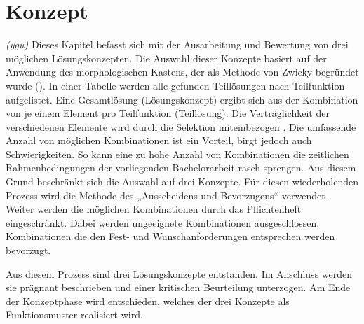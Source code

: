 \newpage
\section{Konzept}
\label{konzept}
\textit{(ygu)} Dieses Kapitel befasst sich mit der Ausarbeitung und Bewertung von drei möglichen Lösungskonzepten. Die Auswahl dieser Konzepte basiert auf der Anwendung des morphologischen Kastens, der als Methode von Zwicky begründet wurde ().   In einer Tabelle werden alle gefunden Teillösungen nach Teilfunktion aufgelistet. Eine Gesamtlösung (Lösungskonzept) ergibt sich aus der Kombination von je einem Element pro Teilfunktion (Teillösung). Die Verträglichkeit der verschiedenen Elemente wird durch die Selektion miteinbezogen \cite{naefe}.
\newline
Die umfassende Anzahl von möglichen Kombinationen ist ein Vorteil, birgt jedoch auch Schwierigkeiten. So kann eine zu hohe Anzahl von Kombinationen die zeitlichen Rahmenbedingungen der vorliegenden Bachelorarbeit rasch sprengen. Aus diesem Grund beschränkt sich die Auswahl auf drei Konzepte. Für diesen wiederholenden Prozess wird die Methode des „Ausscheidens und Bevorzugens“ verwendet \cite{naefe}. Weiter werden die möglichen Kombinationen durch das Pflichtenheft eingeschränkt. Dabei werden ungeeignete Kombinationen ausgeschlossen, Kombinationen die den Fest- und Wunschanforderungen entsprechen werden bevorzugt.

Aus diesem Prozess sind drei Lösungskonzepte entstanden. Im Anschluss werden sie prägnant beschrieben und einer kritischen Beurteilung unterzogen. Am Ende der Konzeptphase wird entschieden, welches der drei Konzepte als Funktionsmuster realisiert wird.
